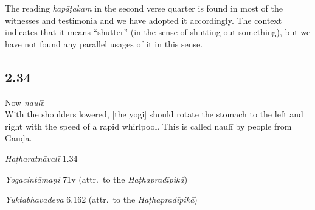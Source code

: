 \begin{ekdosis}
\begin{philcomm}[hp02_033]
The reading \emph{kapāṭakam} in the second verse quarter is found in most of the witnesses and testimonia and we have adopted it accordingly. The context indicates that it means “shutter” (in the sense of shutting out something), but we have not found any parallel usages of it in this sense.
\end{philcomm}

\subsection*{2.34}
\begin{translation}[hp02_034]
Now \emph{naulī}:\\
With the shoulders lowered, [the yogi] should rotate the stomach to the left and right with the speed of a rapid whirlpool. This is called naulī by people from Gauḍa.%
\end{translation}


\begin{testimonia}[hp02_034]
\emph{Haṭharatnāvalī} 1.34 

\begin{versinnote}
\end{versinnote}

\emph{Yogacintāmaṇi} 71v (attr.~to the \emph{Haṭhapradīpikā})

\begin{versinnote}
\end{versinnote}

\emph{Yuktabhavadeva} 6.162 (attr.~to the \emph{Haṭhapradīpikā})

\begin{versinnote}
\end{versinnote}


\end{testimonia}
\end{ekdosis}
